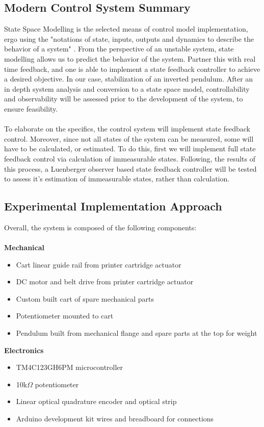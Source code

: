\documentclass[12pt]{article}
\begin{document}
\subsection{Modern Control System Summary}
State Space Modelling is the selected means of control model implementation, ergo using the "notations of state, inputs, outputs and dynamics to describe the behavior of a system" \cite{StateSpace}. From the perspective of an unstable system, state modelling allows us to predict the behavior of the system. Partner this with real time feedback, and one is able to implement a state feedback controller to achieve a desired objective. In our case, stabilization of an inverted pendulum. After an in depth system analysis and conversion to a state space model, controllability and observability will be assessed prior to the development of the system, to ensure feasibility.\\\\
To elaborate on the specifics, the control system will implement state feedback control. Moreover, since not all states of the system can be measured, some will have to be calculated, or estimated. To do this, first we will implement full state feedback control via calculation of immeasurable states. Following, the results of this process, a Luenberger observer based state feedback controller will be tested to assess it's estimation of immeasurable states, rather than calculation.

\subsection{Experimental Implementation Approach}
Overall, the system is composed of the following components:\\\\
\textbf{Mechanical}
\begin{itemize}
    \item Cart linear guide rail from printer cartridge actuator
    \item DC motor and belt drive from printer cartridge actuator
    \item Custom built cart of spare mechanical parts
    \item Potentiometer mounted to cart
    \item Pendulum built from mechanical flange and spare parts at the top for weight
\end{itemize}
\textbf{Electronics}
\begin{itemize}
    \item TM4C123GH6PM microcontroller
    \item 10k$\Omega$ potentiometer
    \item Linear optical quadrature encoder and optical strip
    \item Arduino development kit wires and breadboard for connections
\end{itemize}
\end{document}
